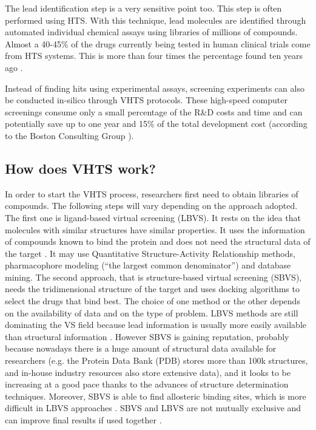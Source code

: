 The lead identification step is a very sensitive point too. This step is often performed using HTS. With this technique, lead molecules are identified through automated individual chemical assays using libraries of millions of compounds. Almost a 40-45\% of the drugs currently being tested in human clinical trials come from HTS systems. This is more than four times the percentage found ten years ago \cite{peter_gwynne_pharmaceutical_????}.

Instead of finding hits using experimental assays, screening experiments can also be conducted in-silico through VHTS protocols. These high-speed computer screenings consume only a small percentage of the R\&D costs and time and can potentially save up to one year and 15\% of the total development cost (according to the Boston Consulting Group \cite{tollman_revolution_2001}).

\subsection{How does VHTS work?}

In order to start the VHTS process, researchers first need to obtain libraries of compounds. The following steps will vary depending on the approach adopted. 
The first one is ligand-based virtual screening (LBVS). It rests on the idea that molecules with similar structures have similar properties. It uses the information of  compounds known to bind the protein and does not need the structural data of the target \cite{dror_novel_2009, clark_prospective_2009}. It may use Quantitative Structure-Activity Relationship methods, pharmacophore modeling (``the largest common denominator'') and database mining. 
The second approach, that is structure-based virtual screening (SBVS), needs the tridimensional structure of the target and uses docking algorithms to select the drugs that bind best. 
The choice of one method or the other depends on the availability of data and on the type of problem. LBVS methods are still dominating the VS field because lead information is usually more easily available than structural information \cite{bajorath_integration_2002}. However SBVS is gaining reputation, probably because nowadays there is a huge amount of structural data available for researchers (e.g. the Protein Data Bank (PDB) \cite{berman_protein_2000} stores more than 100k structures, and in-house industry resources also store extensive data), and it looks to be increasing at a good pace thanks to the advances of structure determination techniques. Moreover, SBVS is able to find allosteric binding sites, which is more difficult in LBVS approaches \cite{tanrikulu_pseudoreceptor_2008}. SBVS and LBVS are not mutually exclusive and can improve final results if used together \cite{schaerfe_critical_2011, gil-redondo_vsdmip_2009, prathipati_integration_2015}.

